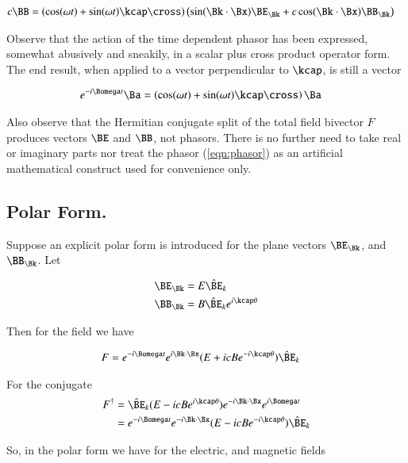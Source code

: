 \begin{align}\label{eqn:magneticSplit}
c \BB &=
\left( \cos(\omega t) + \sin(\omega t) \kcap \cross \right)
\left(
 \sin(\Bk \cdot \Bx) \BE_\Bk
+ c \cos(\Bk \cdot \Bx) \BB_\Bk
\right)
\end{align}

Observe that the action of the time dependent phasor has been expressed, somewhat abusively and sneakily, in a scalar plus cross product operator form.  The end result, when applied to a vector perpendicular to $\kcap$, is still a vector

\begin{align*}
e^{-i\Bomega t} \Ba
&=
\left( \cos(\omega t) + \sin(\omega t) \kcap \cross \right) \Ba
\end{align*}

Also observe that the Hermitian conjugate split of the total field bivector $F$ produces vectors $\BE$ and $\BB$, not phasors.  There is no further need to take real or imaginary parts nor treat the phasor (\ref{eqn:phasor}) as an artificial mathematical construct used for convenience only.

\subsection{Polar Form.}

Suppose an explicit polar form is introduced for the plane vectors $\BE_\Bk$, and $\BB_\Bk$.  Let

\begin{align*}
\BE_\Bk &= E {\hat{\BE}_k} \\
\BB_\Bk &= B {\hat{\BE}_k} e^{i\kcap \theta}
\end{align*}

Then for the field we have

\begin{align}\label{eqn:phasorPolar}
F &= e^{-i\Bomega t} e^{i \Bk \cdot \Bx} (E + i c B e^{-i\kcap \theta}) \hat{\BE}_k
\end{align}

For the conjugate
\begin{align*}
F^\dagger
&=
\hat{\BE}_k
(E - i c B e^{i\kcap \theta})
e^{-i \Bk \cdot \Bx}
e^{i\Bomega t} \\
&=
e^{-i\Bomega t} e^{-i \Bk \cdot \Bx} (E - i c B e^{-i\kcap \theta}) \hat{\BE}_k
\end{align*}

So, in the polar form we have for the electric, and magnetic fields

